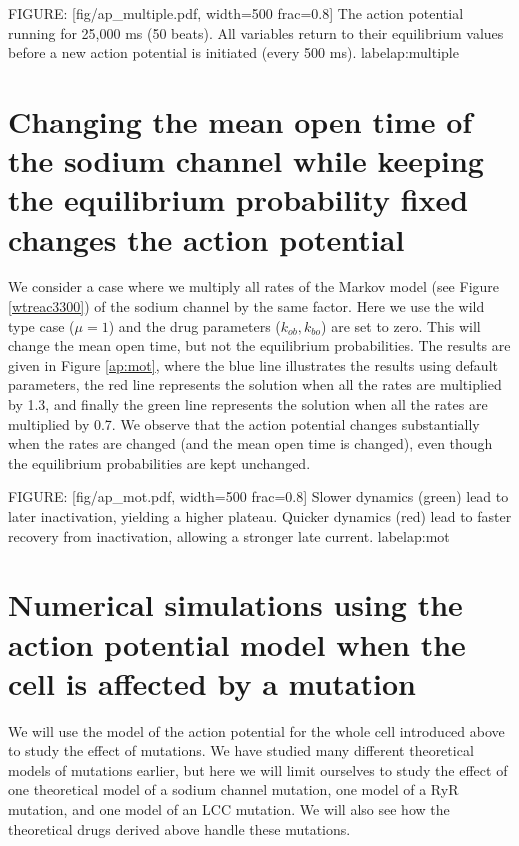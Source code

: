 FIGURE: [fig/ap_multiple.pdf, width=500 frac=0.8] The action potential running for 25,000 ms (50 beats). All variables return to their equilibrium values before a new action potential is initiated (every 500 ms).  label{ap:multiple}

\section[Changing the mean open time]{Changing the mean open time of the sodium channel while keeping the equilibrium probability fixed changes the action potential}
\label{sec:ap_mot}

We consider a case where we multiply all rates of the Markov model (see Figure \ref{wtreac3300}) of the sodium channel by the same factor. Here we use the wild type case ($\mu=1$) and the drug parameters ($k_{ob}, k_{bo}$) are set to zero. This will change the mean open time, but not the equilibrium probabilities. The results are given in Figure \ref{ap:mot}, where the blue line illustrates the results using default parameters, the red line represents the solution when all the rates are multiplied by 1.3, and finally the green line represents the solution when all the rates are multiplied by 0.7. We observe that the action potential changes substantially when the rates are changed (and the mean open time is changed), even though the equilibrium probabilities are kept unchanged.

FIGURE: [fig/ap_mot.pdf, width=500 frac=0.8] Slower dynamics (green) lead to later inactivation, yielding a higher plateau. Quicker dynamics (red) lead to faster recovery from inactivation, allowing a stronger late current.  label{ap:mot}


\section[Numerical action potential; mutations]{Numerical simulations using the action potential model when the cell is affected by a mutation}

We will use the model of the action potential for the whole cell introduced above to study the effect of mutations. We have studied many different theoretical models of mutations earlier, but here we will limit ourselves to study the effect of one theoretical model of a sodium channel mutation, one model of a RyR mutation, and one model of an LCC mutation. We will also see how the theoretical drugs derived above handle these mutations.




